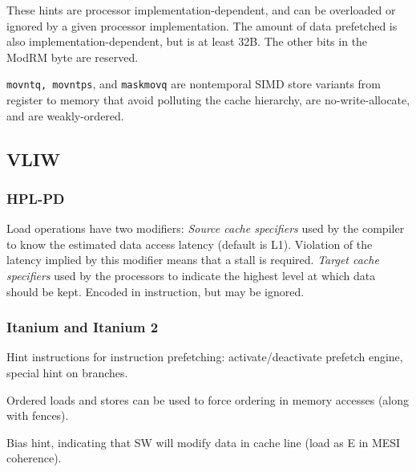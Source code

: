 These hints are processor implementation-dependent, and can be overloaded or ignored by a given processor implementation. The amount of data prefetched is also implementation-dependent, but is at least 32B. The other bits in the ModRM byte are reserved. 

\verb=movntq, movntps=, and \verb=maskmovq= are nontemporal SIMD store variants from register to memory that avoid polluting the cache hierarchy, are no-write-allocate, and are weakly-ordered.

\subsection{VLIW}
\subsubsection{HPL-PD} 

Load operations have two modifiers:
{\em Source cache specifiers} used by the compiler to know the estimated data access latency (default is L1). Violation of the latency implied by this modifier means that a stall is required.
{\em Target cache specifiers} used by the processors to indicate the highest level at which data should be kept. Encoded in instruction, but may be ignored.

\subsubsection{Itanium and Itanium 2}

Hint instructions for instruction prefetching: activate/deactivate prefetch engine, special hint on branches.

Ordered loads and stores can be used to force ordering in memory accesses (along with fences).

Bias hint, indicating that SW will modify data in cache line (load as E in MESI coherence).

